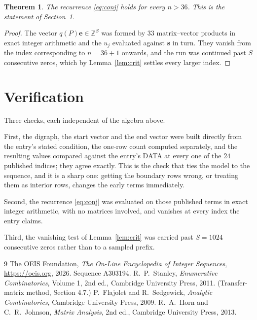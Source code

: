 \documentclass[11pt,a4paper]{article}
\theoremstyle{plain}
\newtheorem{theorem}{Theorem}
\theoremstyle{definition}
\begin{document}
\begin{theorem}
The recurrence \eqref{eq:conj} holds for every $n>36$. This is the statement of
Section~1.
\end{theorem}

\begin{proof}
The vector $q(P)\mathbf{e}\in\mathbb{Z}^{S}$ was formed by $33$ matrix--vector
products in exact integer arithmetic and the $u_j$ evaluated against $\mathbf{s}$ in turn.
They vanish from the index corresponding to $n=36+1$ onwards, and the run was continued
past $S$ consecutive zeros, which by Lemma~\ref{lem:crit} settles every larger index.
\end{proof}

\section{Verification}

Three checks, each independent of the algebra above.

First, the digraph, the start vector and the end vector were built directly from the
entry's stated condition, the one-row count computed separately, and the resulting values
compared against the entry's DATA at every one of the $24$ published indices; they
agree exactly. This is the check that ties the model to the sequence, and it is a sharp one:
getting the boundary rows wrong, or treating them as interior rows, changes the early terms
immediately.

Second, the recurrence \eqref{eq:conj} was evaluated on those published terms in exact
integer arithmetic, with no matrices involved, and vanishes at every index the entry claims.

Third, the vanishing test of Lemma~\ref{lem:crit} was carried past $S=1024$ consecutive
zeros rather than to a sampled prefix.

\begin{thebibliography}{9}
 The OEIS Foundation, \emph{The On-Line Encyclopedia of Integer
Sequences}, \url{https://oeis.org}, 2026. Sequence A303194.
 R.~P.~Stanley, \emph{Enumerative Combinatorics}, Volume 1, 2nd ed.,
Cambridge University Press, 2011. (Transfer-matrix method, Section 4.7.)
 P.~Flajolet and R.~Sedgewick, \emph{Analytic Combinatorics}, Cambridge
University Press, 2009.
 R.~A.~Horn and C.~R.~Johnson, \emph{Matrix Analysis}, 2nd ed., Cambridge
University Press, 2013.
\end{thebibliography}
\end{document}
